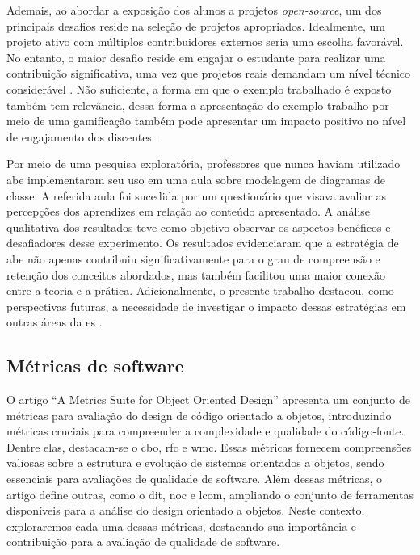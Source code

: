Ademais, ao abordar a exposição dos alunos a projetos \textit{open-source}, um dos principais desafios reside na seleção de projetos apropriados. Idealmente, um projeto ativo com múltiplos contribuidores externos seria uma escolha favorável. No entanto, o maior desafio reside em engajar o estudante para realizar uma contribuição significativa, uma vez que projetos reais demandam um nível técnico considerável \cite{OSSProjects-TheProfessors'Perspective}. Não suficiente, a forma em que o exemplo trabalhado é exposto também tem relevância, dessa forma a apresentação do exemplo trabalho por meio de uma gamificação também pode apresentar um impacto positivo no nível de engajamento dos discentes \cite{Simone.Tonhao-etal:2022}.

Por meio de uma pesquisa exploratória, professores que nunca haviam utilizado \gls{abe}
implementaram seu uso em uma aula sobre modelagem de diagramas de classe. A referida aula foi sucedida por um questionário que visava avaliar as percepções dos aprendizes em relação ao conteúdo apresentado. A análise qualitativa dos resultados teve como objetivo observar os aspectos benéficos e desafiadores desse experimento. Os resultados evidenciaram que a estratégia de \gls{abe} não apenas contribuiu significativamente para o grau de compreensão e retenção dos conceitos abordados, mas também facilitou uma maior conexão entre a teoria e a prática. Adicionalmente, o presente trabalho destacou, como perspectivas futuras, a necessidade de investigar o impacto dessas estratégias em outras áreas da \gls{es} \cite{Tiago.Bonetti-etal:2023}.

\subsection{Métricas de software}
O artigo ``A Metrics Suite for Object Oriented Design'' \cite{MetricsSuite} apresenta um conjunto de métricas para avaliação do design de código orientado a objetos, introduzindo métricas cruciais para compreender a complexidade e qualidade do código-fonte. Dentre elas, destacam-se o \gls{cbo}, \gls{rfc} e \gls{wmc}. Essas métricas fornecem compreensões valiosas sobre a estrutura e evolução de sistemas orientados a objetos, sendo essenciais para avaliações de qualidade de software. Além dessas métricas, o artigo define outras, como o \gls{dit}, \gls{noc} e \gls{lcom}, ampliando o conjunto de ferramentas disponíveis para a análise do design orientado a objetos. Neste contexto, exploraremos cada uma dessas métricas, destacando sua importância e contribuição para a avaliação de qualidade de software.

